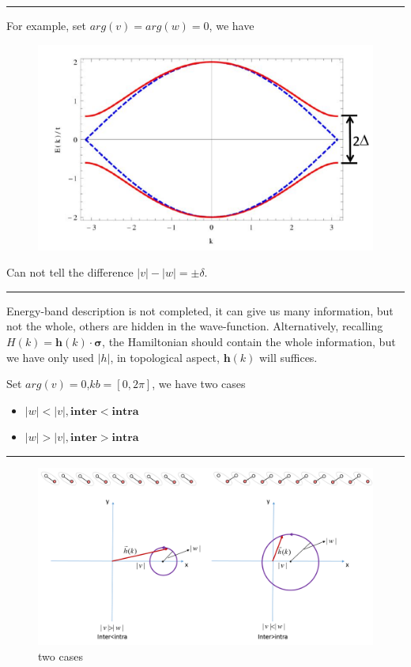 \documentclass[letterpaper,10pt,english]{sphinxmanual}
\begin{document}
\bigskip\hrule{}\bigskip


For example, set \(arg(v)=arg(w)=0\), we have
\begin{figure}[htbp]
\centering

\includegraphics[width=0.700\linewidth]{energy.png}
\end{figure}

Can not tell the difference \(|v|-|w|=\pm\delta\).


\bigskip\hrule{}\bigskip


Energy-band description is not completed, it can give us many
information, but not the whole, others are hidden in the wave-function.
Alternatively, recalling \(H(k)=\mathbf{h}(k)\cdot \mathbf{\sigma}\), the
Hamiltonian should contain the whole information, but we have only used
\(|h|\), in topological aspect, \(\mathbf{h}(k)\) will suffices.

Set \(arg(v)=0\),\(kb=[0,2\pi]\), we have two cases
\begin{itemize}
\item {} 
\(|w|<|v|, \mathbf{inter}<\mathbf{intra}\)

\item {} 
\(|w|>|v|, \mathbf{inter}>\mathbf{intra}\)

\end{itemize}


\bigskip\hrule{}\bigskip

\begin{figure}[htbp]
\centering
\capstart

\includegraphics[width=0.900\linewidth]{two.png}
\caption{two cases}\end{figure}
\end{document}
